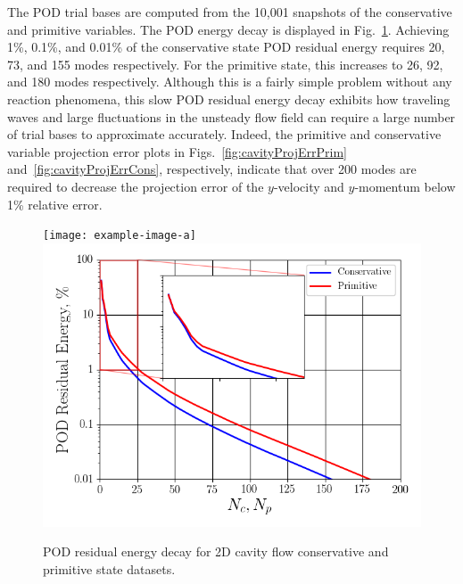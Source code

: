 The POD trial bases are computed from the 10,001 snapshots of the conservative and primitive variables. The POD energy decay is displayed in Fig.~\ref{fig:cavityPODEnergy}. Achieving 1\%, 0.1\%, and 0.01\% of the conservative state POD residual energy requires 20, 73, and 155 modes respectively. For the primitive state, this increases to 26, 92, and 180 modes respectively. Although this is a fairly simple problem without any reaction phenomena, this slow POD residual energy decay exhibits how traveling waves and large fluctuations in the unsteady flow field can require a large number of trial bases to approximate accurately. Indeed, the primitive and conservative variable projection error plots in Figs.~\ref{fig:cavityProjErrPrim} and~\ref{fig:cavityProjErrCons}, respectively, indicate that over 200 modes are required to decrease the projection error of the $y$-velocity and $y$-momentum below 1\% relative error.

\begin{figure}
	\centering
	\ifdefined\DRAFT
		\texttt{[image: example-image-a]}
	\else
		\includegraphics[width=0.8\linewidth]{Chapters/CavityAndCVRC/Images/cavity/cavity_pod_energy_10ms.png}
	\fi
	\caption{\label{fig:cavityPODEnergy}POD residual energy decay for 2D cavity flow conservative and primitive state datasets.}
\end{figure}

